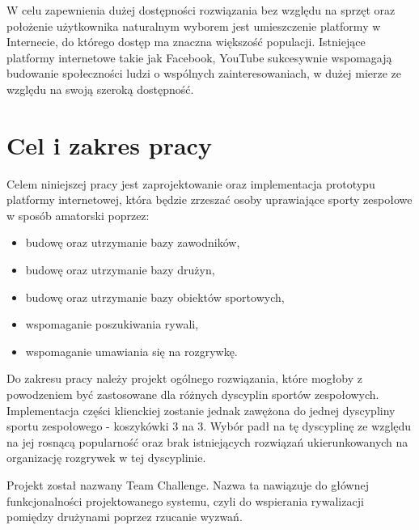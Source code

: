 W celu zapewnienia dużej dostępności rozwiązania bez względu na sprzęt oraz położenie użytkownika naturalnym wyborem jest umieszczenie platformy w Internecie, do którego dostęp ma znaczna większość populacji. Istniejące platformy internetowe takie jak Facebook, YouTube sukcesywnie wspomagają budowanie społeczności ludzi o wspólnych zainteresowaniach, w dużej mierze ze względu na swoją szeroką dostępność.

\section{Cel i zakres pracy}

Celem niniejszej pracy jest zaprojektowanie oraz implementacja prototypu platformy internetowej, która będzie zrzeszać osoby uprawiające sporty zespołowe w sposób amatorski poprzez:

\begin{itemize}
  \item budowę oraz utrzymanie bazy zawodników,
  \item budowę oraz utrzymanie bazy drużyn,
  \item budowę oraz utrzymanie bazy obiektów sportowych,
  \item wspomaganie poszukiwania rywali,
  \item wspomaganie umawiania się na rozgrywkę.
\end{itemize} 

Do zakresu pracy należy projekt ogólnego rozwiązania, które mogłoby z powodzeniem być zastosowane dla różnych dyscyplin sportów zespołowych. Implementacja części klienckiej zostanie jednak zawężona do jednej dyscypliny sportu zespołowego - koszykówki 3 na 3. Wybór padł na tę dyscyplinę ze względu na jej rosnącą popularność oraz brak istniejących rozwiązań ukierunkowanych na organizację rozgrywek w tej dyscyplinie.

Projekt został nazwany Team Challenge. Nazwa ta nawiązuje do głównej funkcjonalności projektowanego systemu, czyli do wspierania rywalizacji pomiędzy drużynami poprzez rzucanie wyzwań.

\begin{comment}


Jako dyscyplina została wybrana koszykówka 3 na 3, która jest młodą . Projektowany system został nazwany Team Challenge. Nazwa ta nawiązuje do głównej funkcjonalności systemu jaką jest rzucanie wyzwań. "Team" odnosi się do głównej grupy docelowej systemu czyli drużyn. "Challenge" nawiązuje do funkcjonalności rzucania wyzwań. I coś że rózne formy wyzwań są popularne. IceBucket Challenge itp. I że może budzić z tego powodu zainteresowanie.

Projektowany system został nazwany Team Challenge. 

Ze względu na duży rozwój

TODO O tym że projekt ogólny a implementacja dla wybranej dziedziny a konkretnie koszykówki 3 na 3 która budzi co raz większe zainteresowanie i np będzie na igrzyskach olimpijskich. Wybór ze względu na popularność dyscypliny i brak dla niej istniejącego rozwiązania\cite{JS07}).
\end{comment}


